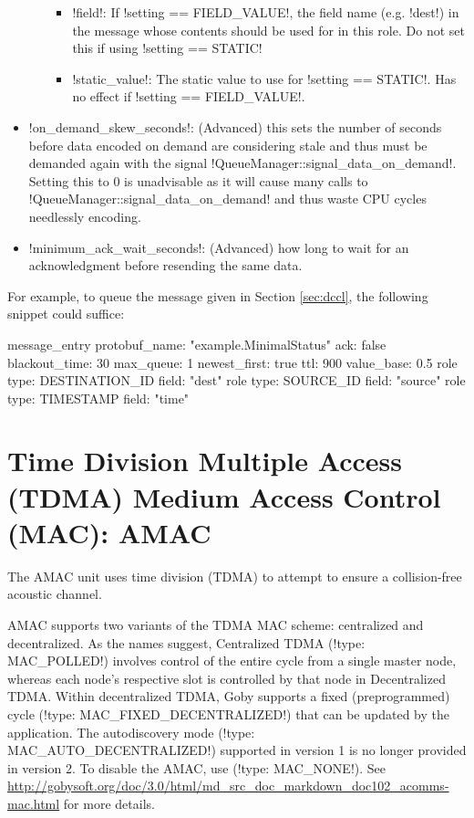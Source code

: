 \begin{itemize}
\begin{itemize}
\begin{itemize}
\item !field!: If !setting == FIELD_VALUE!, the field name (e.g. !dest!) in the message whose contents should be used for in this role. Do not set this if using !setting == STATIC!
\item !static_value!: The static value to use for !setting == STATIC!. Has no effect if !setting == FIELD_VALUE!.
\end{itemize}
\end{itemize}
\item !on_demand_skew_seconds!: (Advanced) this sets the number of seconds before data encoded on demand are considering stale and thus must be demanded again with the signal !QueueManager::signal_data_on_demand!. Setting this to 0 is unadvisable as it will cause many calls to !QueueManager::signal_data_on_demand! and thus waste CPU cycles needlessly encoding.
\item !minimum_ack_wait_seconds!: (Advanced) how long to wait for an acknowledgment before resending the same data.
\end{itemize}

For example, to queue the message given in Section \ref{sec:dccl}, the following snippet could suffice:

\begin{boxedverbatim}
message_entry {
  protobuf_name: "example.MinimalStatus"
  ack: false
  blackout_time: 30
  max_queue: 1
  newest_first: true
  ttl: 900
  value_base: 0.5
  role { type: DESTINATION_ID  field: "dest"   }
  role { type: SOURCE_ID       field: "source" }
  role { type: TIMESTAMP       field: "time"   }
}
\end{boxedverbatim}
\resetbvlinenumber

\section{Time Division Multiple Access (TDMA) Medium Access Control (MAC): AMAC} \label{sec:amac}

The AMAC unit uses time division (TDMA) to attempt to ensure a collision-free acoustic channel.

AMAC supports two variants of the TDMA MAC scheme: centralized and decentralized. As the names suggest, Centralized TDMA (!type: MAC_POLLED!) involves control of the entire cycle from a single master node, whereas each node's respective slot is controlled by that node in Decentralized TDMA. Within decentralized TDMA, Goby supports a fixed (preprogrammed) cycle (!type: MAC_FIXED_DECENTRALIZED!) that can be updated by the application. The autodiscovery mode (!type: MAC_AUTO_DECENTRALIZED!) supported in version 1 is no longer provided in version 2. To disable the AMAC, use (!type: MAC_NONE!). See \url{http://gobysoft.org/doc/3.0/html/md_src_doc_markdown_doc102_acomms-mac.html} for more details.


